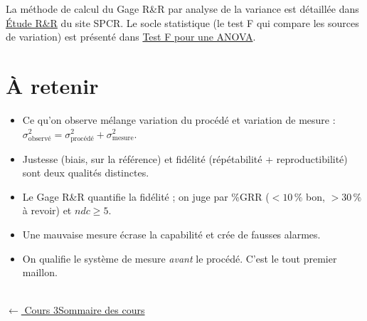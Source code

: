 \documentclass[11pt]{article}
\begin{document}
\begin{plusloin}
La méthode de calcul du Gage R\&R par analyse de la variance est détaillée dans \href{https://sjaubert.github.io/SPCR/R-R-Six-Sigma.html}{Étude R\&R} du site SPCR. Le socle statistique (le test F qui compare les sources de variation) est présenté dans \href{https://sjaubert.github.io/SPCR/ANOVA.html}{Test F pour une ANOVA}.
\end{plusloin}

\section*{\color{uimmblue}À retenir}
\begin{itemize}
\item Ce qu'on observe mélange variation du procédé et variation de mesure : $\sigma^2_{\text{observé}} = \sigma^2_{\text{procédé}} + \sigma^2_{\text{mesure}}$.
\item Justesse (biais, sur la référence) et fidélité (répétabilité + reproductibilité) sont deux qualités distinctes.
\item Le Gage R\&R quantifie la fidélité ; on juge par \%GRR ($<10\,\%$ bon, $>30\,\%$ à revoir) et $ndc \ge 5$.
\item Une mauvaise mesure écrase la capabilité et crée de fausses alarmes.
\item On qualifie le système de mesure \emph{avant} le procédé. C'est le tout premier maillon.
\end{itemize}

\vfill
\noindent\hrulefill\\[2pt]
{\footnotesize\color{uimmgrey}\href{3_Les_Cartes_de_Controle.pdf}{$\leftarrow$ Cours 3}\qquad\qquad\href{index.pdf}{Sommaire des cours}}
\end{document}
